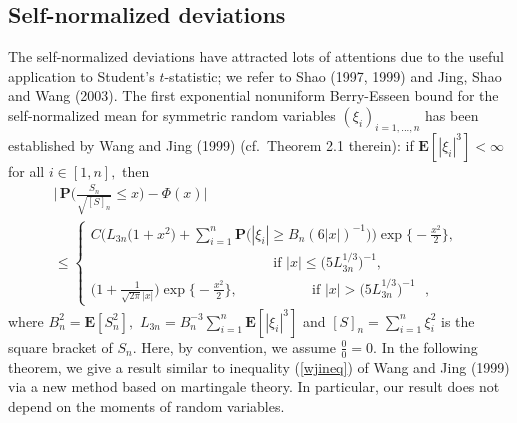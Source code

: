 \documentclass{gSTA2e}
\theoremstyle{plain}
\theoremstyle{definition}
\theoremstyle{remark}
\begin{document}
\subsection{Self-normalized deviations}

The self-normalized deviations have attracted lots of attentions due to the useful application to Student's $t$-statistic; we refer to  Shao (1997, 1999) and Jing, Shao and Wang (2003).
 The first exponential nonuniform Berry-Esseen bound for the self-normalized mean for symmetric
random variables $(\xi_i)_{i=1,...,n}$ has been established by Wang and Jing (1999) (cf.\ Theorem 2.1 therein): if $\mathbf{E}[|\xi_i|^3] < \infty$ for all $i \in [1, n],$ then
\begin{eqnarray}
&&  \bigg|\frac{}{} \mathbf{P}\bigg( \frac{S_n}{\sqrt{[S]_n}} \leq x \bigg)-  \Phi\left( x\right) \bigg| \ \ \ \ \ \ \ \   \ \ \ \    \ \ \ \   \ \ \ \ \  \  \nonumber \\
&& \leq\left\{ \begin{array}{ll}
C\bigg( L_{3n}   \Big( 1+ x^2  \Big)+ \sum_{i=1}^n\mathbf{P}\Big(|\xi_i|\geq B_n(6|x|)^{-1} \Big) \bigg)\exp\bigg\{-\frac{ x^2}{2}\bigg\} ,\ \\
   \ \ \ \ \ \ \ \  \ \   \ \ \ \  \ \   \ \ \ \    \ \ \ \  \ \   \ \ \ \  \ \  \ \ \  \ \ \ \ \  \ \   \ \ \ \ \ \ \ \  \ \  \  \ \  \  \ \ \   \textrm{if\ \   $|x| \leq \Big( 5 L_{3n}^{1/3} \Big)^{-1}$,  }
\\
\bigg(  1+  \frac{1}{\sqrt{2\pi} |x|} \bigg)\exp\bigg\{-\frac{ x^2}{2}\bigg\},   \ \ \ \   \ \ \ \  \ \ \ \   \ \ \ \    \ \ \ \  \ \ \ \     \textrm{if\ \  $|x| > \Big( 5 L_{3n}^{1/3} \Big)^{-1}$ },
\end{array} \right. \ \ \ \ \  \ \ \ \label{wjineq}
\end{eqnarray}
where $B_n^2=\mathbf{E}[S_n^2],$ $L_{3n}= B_n^{-3}\sum_{i=1}^n \mathbf{E}[|\xi_i|^3]$ and $[S]_n=\sum_{i=1}^n\xi_i^2 $ is  the  square bracket  of $S_n$.
Here, by convention, we assume $\frac00=0.$
In the following theorem, we give a  result  similar to  inequality (\ref{wjineq}) of Wang and Jing (1999) via a new method based on martingale theory.  In particular, our result
 does not depend on the moments of random variables.
\end{document}
